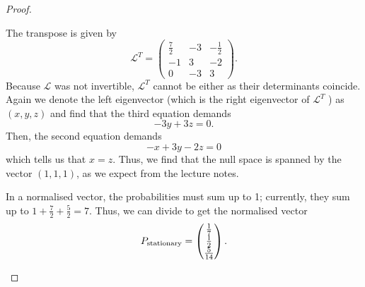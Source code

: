 \begin{proof}
\begin{parts}
The transpose is given by
\[
	\mathcal{L}^T = \begin{pmatrix} \frac{7}{2} & -3 & -\frac{1}{2}\\
	-1 & 3 & -2\\
0 & -3 & 3\end{pmatrix} 
.\] 
Because $\mathcal{L}$ was not invertible, $\mathcal{L}^T$ cannot be either as their determinants coincide. Again we denote the left eigenvector (which is the right eigenvector of $\mathcal{L}^T$ ) as $(x,y,z)$ and find that the third equation demands
\[
-3y + 3z = 0
.\] 
Then, the second equation demands
\[
-x + 3y -2z = 0
\] 
which tells us that $x = z$. Thus, we find that the null space is spanned by the vector $(1,1,1)$, as we expect from the lecture notes.
\item In a normalised vector, the probabilities must sum up to 1; currently, they sum up to $1 + \frac{7}{2}+\frac{5}{2}=7$. Thus, we can divide to get the normalised vector
	\[
		P_\text{stationary} = \begin{pmatrix} \frac{1}{7} \\ \frac{1}{2} \\ \frac{5}{14} \end{pmatrix} 
	.\qedhere\] 
	\end{parts}
\end{proof}
